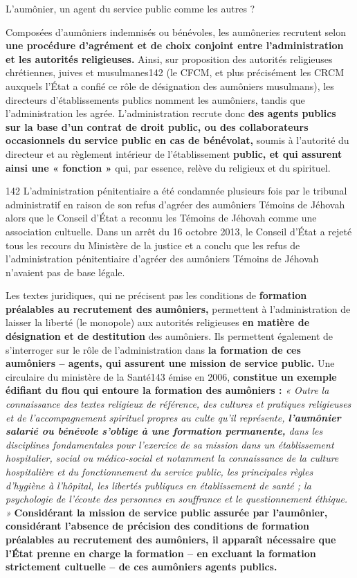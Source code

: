 L'aumônier, un agent du service public comme les autres ?


Composées d'aumôniers indemnisés ou bénévoles, les aumôneries recrutent
selon \textbf{une procédure d'agrément et de choix conjoint entre
l'administration et les autorités religieuses.} Ainsi, sur proposition
des autorités religieuses chrétiennes, juives et musulmanes142 (le CFCM,
et plus précisément les CRCM auxquels l'État a confié ce rôle de
désignation des aumôniers musulmans), les directeurs d'établissements
publics nomment les aumôniers, tandis que l'administration les agrée.
L'administration recrute donc \textbf{des agents publics sur la base
d'un contrat de droit public, ou des collaborateurs occasionnels du
service public en cas de bénévolat,} soumis à l'autorité du directeur et
au règlement intérieur de l'établissement \textbf{public, et qui
assurent ainsi une « fonction »} qui, par essence, relève du religieux
et du spirituel.

142 L'administration pénitentiaire a été condamnée plusieurs fois par le
tribunal administratif en raison de son refus d'agréer des aumôniers
Témoins de Jéhovah alors que le Conseil d'État a reconnu les Témoins de
Jéhovah comme une association cultuelle. Dans un arrêt du 16 octobre
2013, le Conseil d'État a rejeté tous les recours du Ministère de la
justice et a conclu que les refus de l'administration pénitentiaire
d'agréer des aumôniers Témoins de Jéhovah n'avaient pas de base légale.



Les textes juridiques, qui ne précisent pas les conditions de
\textbf{formation préalables au recrutement des aumôniers,} permettent à
l'administration de laisser la liberté (le monopole) aux autorités
religieuses \textbf{en matière de désignation et de destitution} des
aumôniers. Ils permettent également de s'interroger sur le rôle de
l'administration dans \textbf{la formation de ces aumôniers -- agents,
qui assurent une mission de service public.} Une circulaire du ministère
de la Santé143 émise en 2006, \textbf{constitue un exemple édifiant du
flou qui entoure la formation des aumôniers :} \emph{« Outre la
connaissance des textes religieux de référence, des cultures et
pratiques religieuses et de l'accompagnement spirituel propres au culte
qu'il représente, \textbf{l'aumônier salarié ou bénévole s'oblige à une
formation permanente,} dans les disciplines fondamentales pour
l'exercice de sa mission dans un établissement hospitalier, social ou
médico-social et notamment la connaissance de la culture hospitalière et
du fonctionnement du service public, les principales règles d'hygiène à
l'hôpital, les libertés publiques en établissement de santé ; la
psychologie de l'écoute des personnes en souffrance et le questionnement
éthique. »} \textbf{Considérant la mission de service public assurée par
l'aumônier, considérant l'absence de précision des conditions de
formation préalables au recrutement des aumôniers, il apparaît
nécessaire que l'État prenne en charge la formation -- en excluant la
formation strictement cultuelle -- de ces aumôniers agents publics.}


